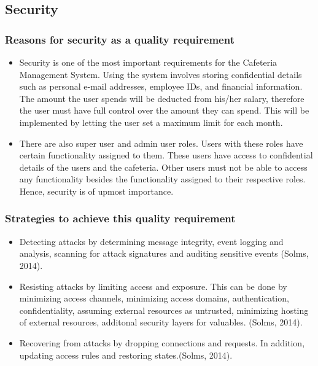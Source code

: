 \documentclass[a4paper,12pt]{article}
\begin{document}
\subsection{Security}

\subsubsection{Reasons for security as a quality requirement}
 \begin{itemize}
 \item Security is one of the most important requirements for the Cafeteria Management System. Using the system involves storing confidential details such as personal e-mail addresses, employee IDs, and financial information. The amount the user spends will be deducted from his/her salary, therefore the user must have full control over the amount they can spend. This will be implemented by letting the user set a maximum limit for each month.  
\item There are also super user and admin user roles. Users with these roles have certain functionality assigned to them. These users have access to confidential details of the users and the cafeteria. Other users must not be able to access any functionality besides the functionality assigned to their respective roles. Hence, security is of upmost importance.
 \end{itemize}

 \subsubsection{Strategies to achieve this quality requirement}
 \begin{itemize}
 \item Detecting attacks by determining message integrity, event logging and analysis, scanning for attack signatures and auditing sensitive events (Solms, 2014).
\item Resisting attacks by limiting access and exposure. This can be done by minimizing access channels, minimizing access domains, authentication, confidentiality, assuming external resources as untrusted, minimizing hosting of external resources, additonal security layers for valuables. (Solms, 2014).
\item Recovering from attacks by dropping connections and requests. In addition, updating access rules and restoring states.(Solms, 2014).
 \end{itemize}
\end{document}

